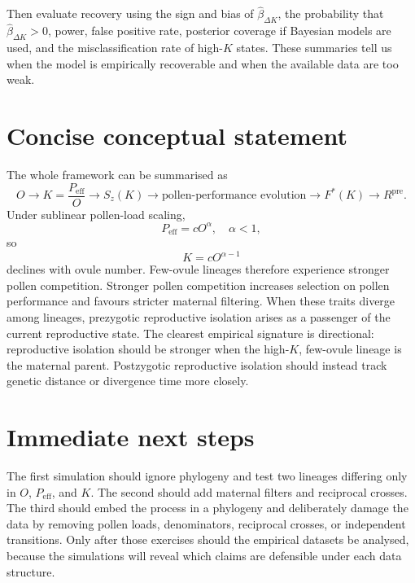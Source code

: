 \documentclass[11pt]{article}
\newcommand{\Peff}{P_{\mathrm{eff}}}
\newcommand{\Rpre}{R^{\mathrm{pre}}}
\begin{document}
Then evaluate recovery using the sign and bias of \(\hat{\beta}_{\Delta K}\), the probability that \(\hat{\beta}_{\Delta K}>0\), power, false positive rate, posterior coverage if Bayesian models are used, and the misclassification rate of high-\(K\) states. These summaries tell us when the model is empirically recoverable and when the available data are too weak.

\section{Concise conceptual statement}

The whole framework can be summarised as
\begin{equation}
O \rightarrow K=\frac{\Peff}{O} \rightarrow S_z(K) \rightarrow \text{pollen-performance evolution} \rightarrow F^*(K) \rightarrow \Rpre.
\end{equation}
Under sublinear pollen-load scaling,
\begin{equation}
\Peff=cO^\alpha, \quad \alpha<1,
\end{equation}
so
\begin{equation}
K=cO^{\alpha-1}
\end{equation}
declines with ovule number. Few-ovule lineages therefore experience stronger pollen competition. Stronger pollen competition increases selection on pollen performance and favours stricter maternal filtering. When these traits diverge among lineages, prezygotic reproductive isolation arises as a passenger of the current reproductive state. The clearest empirical signature is directional: reproductive isolation should be stronger when the high-\(K\), few-ovule lineage is the maternal parent. Postzygotic reproductive isolation should instead track genetic distance or divergence time more closely.

\section*{Immediate next steps}

The first simulation should ignore phylogeny and test two lineages differing only in \(O\), \(\Peff\), and \(K\). The second should add maternal filters and reciprocal crosses. The third should embed the process in a phylogeny and deliberately damage the data by removing pollen loads, denominators, reciprocal crosses, or independent transitions. Only after those exercises should the empirical datasets be analysed, because the simulations will reveal which claims are defensible under each data structure.
\end{document}
